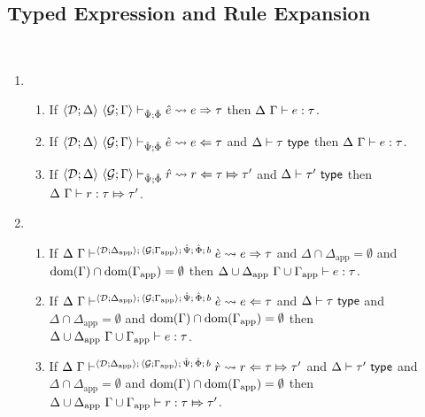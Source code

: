 \subsection{Typed Expression and Rule Expansion}\label{appendix:P-typed-expression-expansion}
\begin{theorem}\label{thm:typed-expansion-full-B} ~
\begin{enumerate}
  \item \begin{enumerate}
    \item If $\langle \mathcal{D}; \Delta \rangle~\langle \mathcal{G}; \Gamma \rangle \vdash_{\hat{\Psi}; \hat\Phi} {\hat e} \leadsto e \Rightarrow \tau$ then $\Delta~\Gamma \vdash e : \tau$.
    \item If $\langle \mathcal{D}; \Delta \rangle~\langle \mathcal{G}; \Gamma \rangle \vdash_{\hat{\Psi}; \hat\Phi} {\hat e} \leadsto e \Leftarrow \tau$ and $\Delta \vdash \tau~\mathsf{type}$ then $\Delta~\Gamma \vdash e : \tau$.
    \item If $\langle \mathcal{D}; \Delta \rangle~\langle \mathcal{G}; \Gamma \rangle \vdash_{\hat{\Psi}; \hat\Phi} \hat{r} \leadsto r \Leftarrow \tau \Mapsto \tau'$ and $\Delta \vdash \tau'~\mathsf{type}$ then $\Delta~\Gamma \vdash r : \tau \Mapsto \tau'$.
  \end{enumerate}
  \item \begin{enumerate}
    \item If $\Delta~\Gamma \vdash^{\langle \mathcal{D}; \Delta_\text{app} \rangle;\,\langle \mathcal{G}; \Gamma_\text{app} \rangle;\,\hat{\Psi};\,\hat\Phi;\,b} \grave{e} \leadsto e \Rightarrow \tau$ and $\Delta \cap \Delta_\text{app}=\emptyset$ and $\text{dom}(\Gamma) \cap \text{dom}(\Gamma_\text{app})=\emptyset$ then ${\Delta}\cup{\Delta_\text{app}}~{\Gamma}\cup{\Gamma_\text{app}} \vdash e : \tau$. 
    \item If $\Delta~\Gamma \vdash^{\langle \mathcal{D}; \Delta_\text{app} \rangle;\,\langle \mathcal{G}; \Gamma_\text{app} \rangle;\,\hat{\Psi};\,\hat\Phi;\,b} \grave{e} \leadsto e \Leftarrow \tau$ and $\Delta \vdash \tau~\mathsf{type}$ and $\Delta \cap \Delta_\text{app}=\emptyset$ and $\text{dom}(\Gamma) \cap \text{dom}(\Gamma_\text{app})=\emptyset$ then ${\Delta}\cup{\Delta_\text{app}}~{\Gamma}\cup{\Gamma_\text{app}} \vdash e : \tau$. 
    \item If $\Delta~\Gamma \vdash^{\langle \mathcal{D}; \Delta_\text{app} \rangle;\,\langle \mathcal{G}; \Gamma_\text{app} \rangle;\,\hat{\Psi};\,\hat\Phi;\,b} \grave{r} \leadsto r \Leftarrow \tau \Mapsto \tau'$ and $\Delta \vdash \tau'~\mathsf{type}$ and $\Delta \cap \Delta_\text{app}=\emptyset$ and $\text{dom}(\Gamma) \cap \text{dom}(\Gamma_\text{app})=\emptyset$ then ${\Delta}\cup{\Delta_\text{app}}~{\Gamma}\cup{\Gamma_\text{app}} \vdash r : \tau \Mapsto \tau'$.
  \end{enumerate}
\end{enumerate}
\end{theorem}
